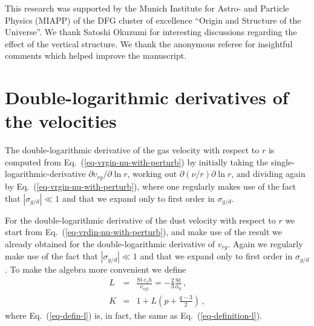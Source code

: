 \documentclass{aa}
\def\comma{\,,}
\begin{document}
\begin{acknowledgements}
  This research was supported by the Munich Institute for Astro- and Particle
  Physics (MIAPP) of the DFG cluster of excellence ``Origin and Structure of the
  Universe''. We thank Satoshi Okuzumi for interesting discussions regarding the
  effect of the vertical structure. We thank the anonymous referee for insightful
  comments which helped improve the manuscript.
\end{acknowledgements}


\begingroup


\endgroup

\appendix

\section{Double-logarithmic derivatives of the velocities}\label{app-dbllog-v}
The double-logarithmic derivative of the gas velocity with respect to $r$ is
computed from Eq.~(\ref{eq-vrgin-nu-with-perturb}) by initially taking the
single-logarithmic-derivative $\partial v_{rg}/\partial\ln r$, working out
$\partial(\nu/r)\partial\ln r$, and dividing again by
Eq.~(\ref{eq-vrgin-nu-with-perturb}), where one regularly makes use of the fact
that $|\sigma_{g/d}|\ll 1$ and that we expand only to first order in
$\sigma_{g/d}$.

For the double-logarithmic derivative of the dust velocity with respect to $r$
we start from Eq.~(\ref{eq-vrdin-nu-with-perturb}), and make use of the result
we already obtained for the double-logarithmic derivative of $v_{rg}$. Again we
regularly make use of the fact that $|\sigma_{g/d}|\ll 1$ and that we expand
only to first order in $\sigma_{g/d}$. To make the algebra more convenient
we define
\begin{eqnarray}
  L&=& \frac{\mathrm{St}\,c_sh}{v_{rg1}} = -\frac{2}{3}\frac{\mathrm{St}}{\alpha_0}\comma
\label{eq-defin-l}\\
  K&=& 1+L \left(p+ \frac{q-3}{2}\right)\comma\label{eq-defin-k}
\end{eqnarray}
where Eq.~(\ref{eq-defin-l}) is, in fact, the same as
Eq.~(\ref{eq-definition-l}).
\end{document}
